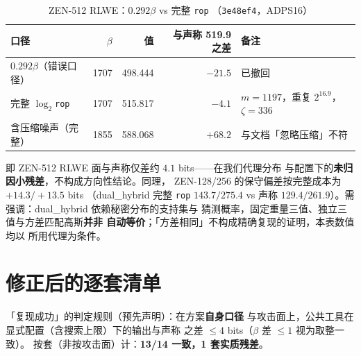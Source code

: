 \documentclass[11pt,a4paper,zihao=-4]{ctexart}
\newcommand{\code}[1]{\texttt{#1}}
\begin{document}
\begin{table}[htbp]\centering\small
\caption{ZEN-512 RLWE：$0.292\beta$ vs 完整 \code{rop}
（\code{3e48ef4}，ADPS16）}\label{tab:fullcost}
\begin{tabular}{@{}lrrrl@{}}
\toprule
口径 & $\beta$ & 值 & 与声称 519.9 之差 & 备注 \\
\midrule
$0.292\beta$（错误口径） & 1707 & 498.444 & $-21.5$ & 已撤回 \\
完整 $\log_2$\code{rop} & 1707 & 515.817 & $\mathbf{-4.1}$ &
$m{=}1197$，重复 $2^{16.9}$，$\zeta{=}336$ \\
含压缩噪声（完整） & 1855 & 588.068 & $+68.2$ & 与文档「忽略压缩」不符 \\
\bottomrule
\end{tabular}
\end{table}

即 ZEN-512 RLWE 面与声称仅差约 $4.1$ bits——在我们代理分布
与配置下的\textbf{未归因小残差}，不构成方向性结论。同理，
ZEN-128/256 的保守偏差按完整成本为 $+14.3/+13.5$ bits
（dual\_hybrid 完整 \code{rop} $143.7/275.4$ vs 声称
$129.4/261.9$）。需强调：dual\_hybrid 依赖秘密分布的支持集与
猜测概率，固定重量三值、独立三值与方差匹配高斯\textbf{并非
自动等价}；「方差相同」不构成精确复现的证明，本表数值均以
所用代理为条件。

\section{修正后的逐套清单}\label{sec:inventory}

「复现成功」的判定规则（预先声明）：在方案\textbf{自身口径}
与攻击面上，公共工具在显式配置（含搜索上限）下的输出与声称
之差 $\le 4$ bits（$\beta$ 差 $\le 1$ 视为取整一致）。
按套（非按攻击面）计：\textbf{13/14 一致，1 套实质残差}。
\end{document}
